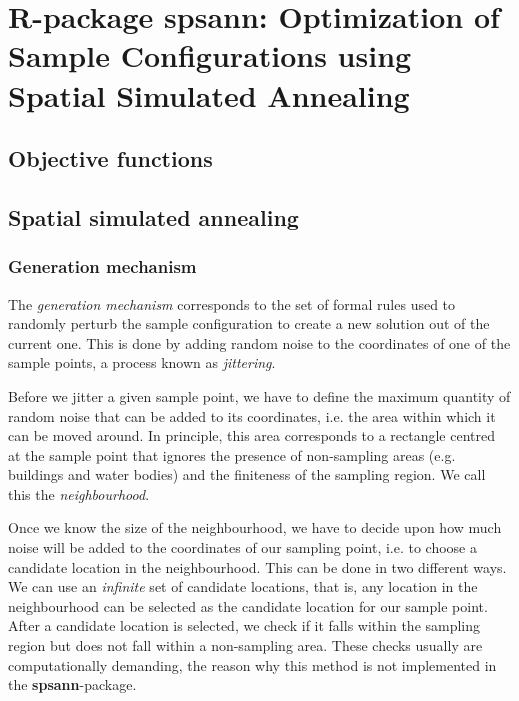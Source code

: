 \artigofalse
\chapter{R-package spsann: Optimization of Sample Configurations using Spatial 
Simulated Annealing}
\label{apen:spsann}

% 

\section{Objective functions}



\section{Spatial simulated annealing}

\subsection{Generation mechanism}

The \textit{generation mechanism} corresponds to the set of formal rules used 
to randomly perturb the sample conﬁguration to create a new solution out of the
current one. This is done by adding random noise to the coordinates of one of 
the sample points, a process known as \textit{jittering}.

Before we jitter a given sample point, we have to define the maximum quantity 
of random noise that can be added to its coordinates, i.e. the area within 
which it can be moved around. In principle, this area corresponds to a rectangle
centred at the sample point that ignores the presence of non-sampling areas 
(e.g. buildings and water bodies) and the finiteness of the sampling region. We 
call this the \textit{neighbourhood}.

Once we know the size of the neighbourhood, we have to decide upon how much 
noise will be added to the coordinates of our sampling point, i.e. to choose a
candidate location in the neighbourhood. This can be done in two different ways.
We can use an \textit{infinite} set of candidate locations, that is, any 
location in the neighbourhood can be selected as the candidate location for our 
sample point. After a candidate location is selected, we check if it falls 
within the sampling region but does not fall within a non-sampling area. These 
checks usually are computationally demanding, the reason why this method is not 
implemented in the \textbf{spsann}-package.

